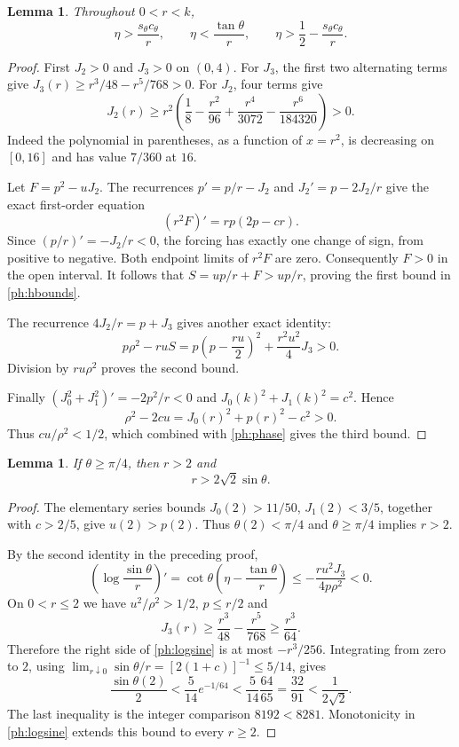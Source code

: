 \documentclass[11pt]{article}
\newtheorem{lemma}[theorem]{Lemma}
\theoremstyle{remark}
\begin{document}
\begin{lemma}\label{ph:diskbounds}
Throughout $0<r<k$,
\begin{equation}\label{ph:hbounds}
 \eta>\frac{s_\theta c_\theta}{r},\qquad \eta<\frac{\tan\theta}{r},\qquad
 \eta>\frac12-\frac{s_\theta c_\theta}{r}.
\end{equation}
\end{lemma}
\begin{proof}
First $J_2>0$ and $J_3>0$ on $(0,4)$. For $J_3$, the first two
alternating terms give $J_3(r)\ge r^3/48-r^5/768>0$.
For $J_2$, four terms give
\[
 J_2(r)\ge r^2\left(\frac18-\frac{r^2}{96}
                 +\frac{r^4}{3072}-\frac{r^6}{184320}\right)>0.
\]
Indeed the polynomial in parentheses, as a function of $x=r^2$,
is decreasing on $[0,16]$ and has value $7/360$ at $16$.

Let $F=p^2-uJ_2$. The recurrences $p'=p/r-J_2$ and
$J_2'=p-2J_2/r$ give the exact first-order equation
\[
 (r^2F)'=rp(2p-cr).
\]
Since $(p/r)'=-J_2/r<0$, the forcing has exactly one change of sign,
from positive to negative. Both endpoint limits of $r^2F$ are zero.
Consequently $F>0$ in the open interval. It follows that
$S=up/r+F>up/r$, proving the first bound in \eqref{ph:hbounds}.

The recurrence $4J_2/r=p+J_3$ gives another exact identity:
\[
 p \rho^2-ruS=p\left(p-\frac{ru}2\right)^2
                  +\frac{r^2u^2}{4}J_3>0.
\]
Division by $ru\rho^2$ proves the second bound.

Finally $(J_0^2+J_1^2)'=-2p^2/r<0$ and
$J_0(k)^2+J_1(k)^2=c^2$. Hence
\[
 \rho^2-2cu=J_0(r)^2+p(r)^2-c^2>0.
\]
Thus $cu/\rho^2<1/2$, which combined with \eqref{ph:phase} gives the
third bound.
\end{proof}

\begin{lemma}\label{ph:radius}
If $\theta\ge\pi/4$, then $r>2$ and
\[
 r>2\sqrt2\sin\theta.
\]
\end{lemma}
\begin{proof}
The elementary series bounds $J_0(2)>11/50$,
$J_1(2)<3/5$, together with $c>2/5$, give $u(2)>p(2)$.
Thus $\theta(2)<\pi/4$ and $\theta\ge\pi/4$ implies $r>2$.

By the second identity in the preceding proof,
\begin{equation}\label{ph:logsine}
 \left(\log\frac{\sin\theta}{r}\right)'
 =\cot\theta\left(\eta-\frac{\tan\theta}{r}\right)
 \le-\frac{ru^2J_3}{4p \rho^2}<0.
\end{equation}
On $0<r\le2$ we have $u^2/\rho^2>1/2$, $p\le r/2$ and
\[
 J_3(r)\ge\frac{r^3}{48}-\frac{r^5}{768}
          \ge\frac{r^3}{64}.
\]
Therefore the right side of \eqref{ph:logsine} is at most
$-r^3/256$. Integrating from zero to $2$, using
$\lim_{r\downarrow0}\sin\theta/r=[2(1+c)]^{-1}\le5/14$,
gives
\[
 \frac{\sin\theta(2)}2
 <\frac5{14}e^{-1/64}<\frac5{14}\frac{64}{65}
 =\frac{32}{91}<\frac1{2\sqrt2}.
\]
The last inequality is the integer comparison $8192<8281$.
Monotonicity in \eqref{ph:logsine} extends this bound to every $r\ge2$.
\end{proof}
\end{document}
